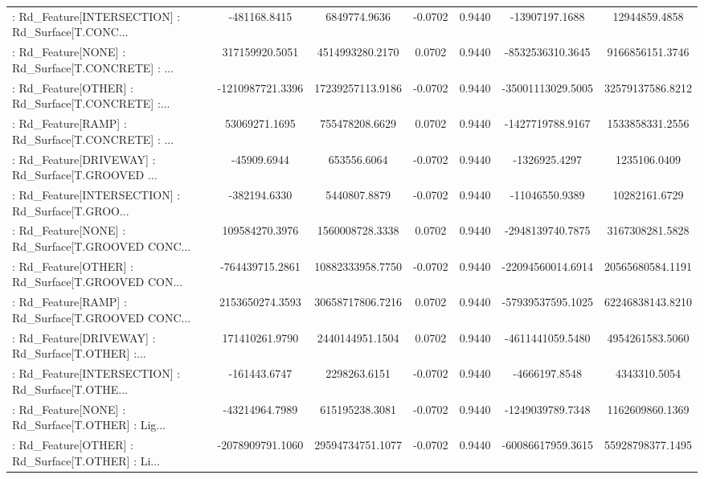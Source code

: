 \begin{longtable}{p{4cm}cccccc}
 : Rd\_Feature[INTERSECTION] : Rd\_Surface[T.CONC... &      -481168.8415 &      6849774.9636 & -0.0702 &       0.9440 &     -13907197.1688 &     12944859.4858 \\
 : Rd\_Feature[NONE] : Rd\_Surface[T.CONCRETE] : ... &    317159920.5051 &   4514993280.2170 &  0.0702 &       0.9440 &   -8532536310.3645 &   9166856151.3746 \\
 : Rd\_Feature[OTHER] : Rd\_Surface[T.CONCRETE] :... &  -1210987721.3396 &  17239257113.9186 & -0.0702 &       0.9440 &  -35001113029.5005 &  32579137586.8212 \\
 : Rd\_Feature[RAMP] : Rd\_Surface[T.CONCRETE] : ... &     53069271.1695 &    755478208.6629 &  0.0702 &       0.9440 &   -1427719788.9167 &   1533858331.2556 \\
 : Rd\_Feature[DRIVEWAY] : Rd\_Surface[T.GROOVED ... &       -45909.6944 &       653556.6064 & -0.0702 &       0.9440 &      -1326925.4297 &      1235106.0409 \\
 : Rd\_Feature[INTERSECTION] : Rd\_Surface[T.GROO... &      -382194.6330 &      5440807.8879 & -0.0702 &       0.9440 &     -11046550.9389 &     10282161.6729 \\
 : Rd\_Feature[NONE] : Rd\_Surface[T.GROOVED CONC... &    109584270.3976 &   1560008728.3338 &  0.0702 &       0.9440 &   -2948139740.7875 &   3167308281.5828 \\
 : Rd\_Feature[OTHER] : Rd\_Surface[T.GROOVED CON... &   -764439715.2861 &  10882333958.7750 & -0.0702 &       0.9440 &  -22094560014.6914 &  20565680584.1191 \\
 : Rd\_Feature[RAMP] : Rd\_Surface[T.GROOVED CONC... &   2153650274.3593 &  30658717806.7216 &  0.0702 &       0.9440 &  -57939537595.1025 &  62246838143.8210 \\
 : Rd\_Feature[DRIVEWAY] : Rd\_Surface[T.OTHER] :... &    171410261.9790 &   2440144951.1504 &  0.0702 &       0.9440 &   -4611441059.5480 &   4954261583.5060 \\
 : Rd\_Feature[INTERSECTION] : Rd\_Surface[T.OTHE... &      -161443.6747 &      2298263.6151 & -0.0702 &       0.9440 &      -4666197.8548 &      4343310.5054 \\
 : Rd\_Feature[NONE] : Rd\_Surface[T.OTHER] : Lig... &    -43214964.7989 &    615195238.3081 & -0.0702 &       0.9440 &   -1249039789.7348 &   1162609860.1369 \\
 : Rd\_Feature[OTHER] : Rd\_Surface[T.OTHER] : Li... &  -2078909791.1060 &  29594734751.1077 & -0.0702 &       0.9440 &  -60086617959.3615 &  55928798377.1495 \\

\end{longtable}

